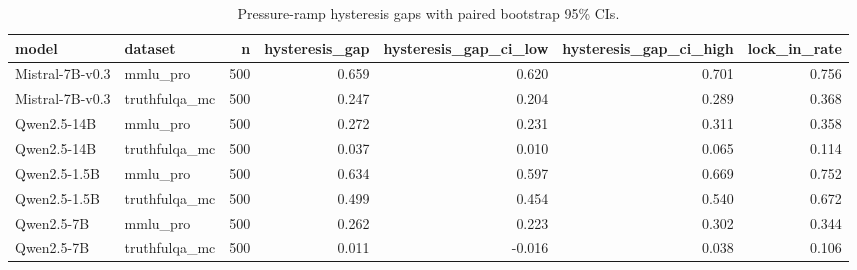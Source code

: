 \begin{table}
\caption{Pressure-ramp hysteresis gaps with paired bootstrap 95\% CIs.}
\label{tab:pressure-ramp-with-ci}
\begin{tabular}{llrrrrr}
\toprule
model & dataset & n & hysteresis\_gap & hysteresis\_gap\_ci\_low & hysteresis\_gap\_ci\_high & lock\_in\_rate \\
\midrule
Mistral-7B-v0.3 & mmlu\_pro & 500 & 0.659 & 0.620 & 0.701 & 0.756 \\
Mistral-7B-v0.3 & truthfulqa\_mc & 500 & 0.247 & 0.204 & 0.289 & 0.368 \\
Qwen2.5-14B & mmlu\_pro & 500 & 0.272 & 0.231 & 0.311 & 0.358 \\
Qwen2.5-14B & truthfulqa\_mc & 500 & 0.037 & 0.010 & 0.065 & 0.114 \\
Qwen2.5-1.5B & mmlu\_pro & 500 & 0.634 & 0.597 & 0.669 & 0.752 \\
Qwen2.5-1.5B & truthfulqa\_mc & 500 & 0.499 & 0.454 & 0.540 & 0.672 \\
Qwen2.5-7B & mmlu\_pro & 500 & 0.262 & 0.223 & 0.302 & 0.344 \\
Qwen2.5-7B & truthfulqa\_mc & 500 & 0.011 & -0.016 & 0.038 & 0.106 \\
\bottomrule
\end{tabular}
\end{table}
